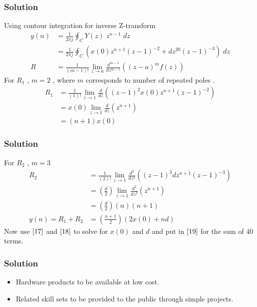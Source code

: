 \documentclass{beamer}
\providecommand{\brak}[1]{\ensuremath{\left(#1\right)}}
\theoremstyle{remark}
\begin{document}
\begin{frame}
\frametitle{Solution}
Using contour integration for inverse Z-transform
\begin{align}
    y(n)&=\frac{1}{2\pi j}\oint_{C}Y(z) \;z^{n-1} \;dz\\  
 &=\frac{1}{2\pi j}\oint_{C}\brak{x(0)z^{n+1}\brak{z-1}^{-2}+
       dz^{20}\brak{z-1}^{-3}} \;dz\\
       R&=\frac{1}{\brak {m-1}!}\lim\limits_{z\to a}\frac{d^{m-1}}{dz^{m-1}}\brak {{(z-a)}^{m}f\brak z}
\end{align}
For $R_1$ , $m=2$ , where $m$ corresponds to number of repeated poles .
\begin{align}
    R_1 &=\frac{1}{\brak {1}!}\lim\limits_{z\to 1}\frac{d}{dz}\brak {{(z-1)}^{2}x(0)z^{n+1}\brak{z-1}^{-2}}   \\
    &=x(0)\lim\limits_{z\to 1}\frac{d}{dz}(z^{n+1})   \\
    &= \brak{n+1}x(0)
    \end{align}
\end{frame}












\begin{frame}
\frametitle{Solution}
   For $R_2$ , $m=3$ 
    \begin{align}
    R_2 &=\frac{1}{\brak {2}!}\lim\limits_{z\to 1}\frac{d^{2}}{dz^{2}}\brak {{(z-1)}^{3}dz^{n+1}\brak{z-1}^{-3}}   \\
        &=\brak{\frac{d}{2}}\lim\limits_{z\to 1}\frac{d^2}{dz^2}(z^{n+1})   \\
    &= \brak{\frac{d}{2}}\brak{n}\brak{n+1}\\
   y(n)= R_1 + R_2 &= \brak{\frac{n+1}{2}}\brak{2x(0) + nd} \label{19}
\end{align}
Now use $\eqref{17}$ and $\eqref{18}$ to solve for $x(0)$ and $d$ and put in $\eqref{19}$ for the sum of $40$ terms.
\end{frame} 

\begin{frame}
\frametitle{Solution}
\begin{itemize}

\item Hardware products to be available at low cost.
\item Related skill sets to be provided to the public through simple projects. 
\end{itemize}
\end{frame}
\end{document}
